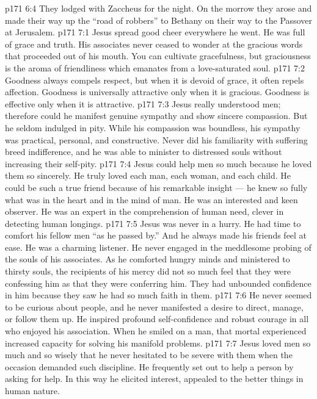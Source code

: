 \vs p171 6:4 They lodged with Zaccheus for the night. On the morrow they arose and made their way up the “road of robbers” to Bethany on their way to the Passover at Jerusalem.
\vs p171 7:1 Jesus spread good cheer everywhere he went. He was full of grace and truth. His associates never ceased to wonder at the gracious words that proceeded out of his mouth. You can cultivate gracefulness, but graciousness is the aroma of friendliness which emanates from a love\hyp{}saturated soul.
\vs p171 7:2 Goodness always compels respect, but when it is devoid of grace, it often repels affection. Goodness is universally attractive only when it is gracious. Goodness is effective only when it is attractive.
\vs p171 7:3 Jesus really understood men; therefore could he manifest genuine sympathy and show sincere compassion. But he seldom indulged in pity. While his compassion was boundless, his sympathy was practical, personal, and constructive. Never did his familiarity with suffering breed indifference, and he was able to minister to distressed souls without increasing their self\hyp{}pity.
\vs p171 7:4 Jesus could help men so much because he loved them so sincerely. He truly loved each man, each woman, and each child. He could be such a true friend because of his remarkable insight --- he knew so fully what was in the heart and in the mind of man. He was an interested and keen observer. He was an expert in the comprehension of human need, clever in detecting human longings.
\vs p171 7:5 Jesus was never in a hurry. He had time to comfort his fellow men “as he passed by.” And he always made his friends feel at ease. He was a charming listener. He never engaged in the meddlesome probing of the souls of his associates. As he comforted hungry minds and ministered to thirsty souls, the recipients of his mercy did not so much feel that they were confessing  him as that they were conferring  him. They had unbounded confidence in him because they saw he had so much faith in them.
\vs p171 7:6 He never seemed to be curious about people, and he never manifested a desire to direct, manage, or follow them up. He inspired profound self\hyp{}confidence and robust courage in all who enjoyed his association. When he smiled on a man, that mortal experienced increased capacity for solving his manifold problems.
\vs p171 7:7 Jesus loved men so much and so wisely that he never hesitated to be severe with them when the occasion demanded such discipline. He frequently set out to help a person by asking for help. In this way he elicited interest, appealed to the better things in human nature.
